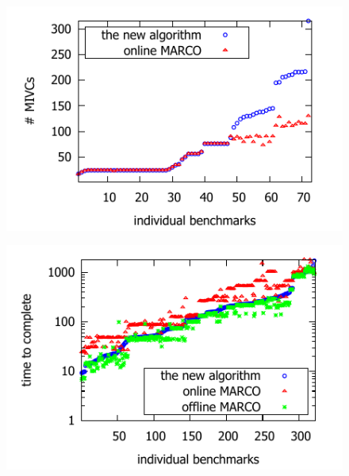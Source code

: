 \begin{figure}
\centering
\begin{minipage}{.45\textwidth}
\centering
\includegraphics[scale=0.8]{./plots/found_mivcs.pdf}%
%
\label{res:found_mivcs}
\end{minipage}\hfill
\begin{minipage}{.45\textwidth}
\centering
\includegraphics[scale=0.8]{./plots/time_to_complete.pdf}%
%
\label{res:time_to_complete}
\end{minipage}
\end{figure}



